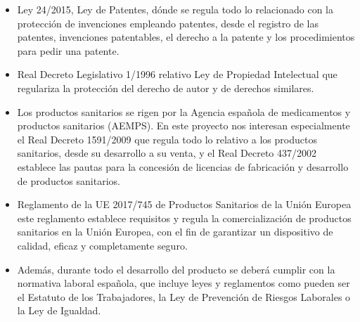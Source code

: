 \begin{itemize}
    \item Ley 24/2015\cite{patentes}, Ley de Patentes, dónde se regula todo lo relacionado con la protección de invenciones empleando patentes, desde el registro de las patentes, invenciones patentables, el derecho a la patente y los procedimientos para pedir una patente.
    
    \item Real Decreto Legislativo 1/1996\cite{PropIntelectual} relativo Ley de Propiedad Intelectual que regulariza la protección del derecho de autor y de derechos similares.
    
    \item Los productos sanitarios se rigen por la Agencia española de medicamentos y productos sanitarios (AEMPS)\cite{AEMPS}. En este proyecto nos interesan especialmente el Real Decreto 1591/2009\cite{prodSanitario1} que regula todo lo relativo a los productos sanitarios, desde su desarrollo a su venta, y el Real Decreto 437/2002\cite{prodSanitario2} establece las pautas para la concesión de licencias de fabricación y desarrollo de productos sanitarios.
    
    \item Reglamento de la UE 2017/745\cite{ProdSanitariosEU} de Productos Sanitarios de la Unión Europea este reglamento establece requisitos y regula la comercialización de productos sanitarios en la Unión Europea, con el fin de garantizar un dispositivo de calidad, eficaz y completamente seguro.
    
    \item Además, durante todo el desarrollo del producto se deberá cumplir con la normativa laboral española\cite{normaLaboral}, que incluye leyes y reglamentos como pueden ser el Estatuto de los Trabajadores, la Ley de Prevención de Riesgos Laborales o la Ley de Igualdad.
    
\end{itemize}


